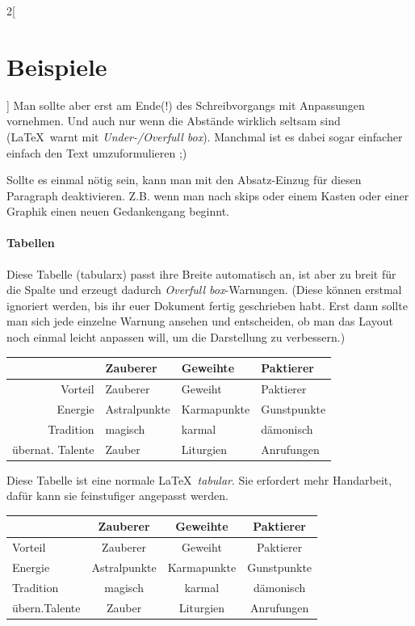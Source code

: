 \documentclass[linksbund,ATvorVT]{rpg-ilaris}
\begin{document}
\begin{multicols}{2}[        %
		\chapter*{Beispiele}  %
		]
Man sollte aber erst am Ende(!) des Schreibvorgangs mit  Anpassungen vornehmen. Und auch nur wenn die Abstände wirklich seltsam sind (\LaTeX\ warnt mit \emph{Under-/Overfull box}). Manchmal ist es dabei sogar einfacher einfach den Text umzuformulieren ;)

Sollte es einmal nötig sein, kann man mit  den Absatz-Einzug für diesen Paragraph deaktivieren. Z.B. wenn man nach skips oder einem Kasten oder einer Graphik einen neuen Gedankengang beginnt.


\subsubsection{Tabellen}
Diese Tabelle (tabularx) passt ihre Breite automatisch an, ist aber zu breit für die Spalte und erzeugt dadurch \emph{Overfull box}-Warnungen. (Diese können erstmal ignoriert werden, bis ihr euer Dokument fertig geschrieben habt. Erst dann sollte man sich jede einzelne Warnung ansehen und entscheiden, ob man das Layout noch einmal leicht anpassen will, um die Darstellung zu verbessern.)

\begin{tabularx}{\linewidth}{rXXX}
			  & \textbf{Zauberer} & \textbf{Geweihte} & \textbf{Paktierer} \\
	\hline
	Vorteil	  & Zauberer	 & Geweiht	   & Paktierer \\   
	Energie	  & Astralpunkte & Karmapunkte & Gunstpunkte \\ 
	Tradition & magisch	     & karmal	   & dämonisch \\   
übernat. Talente & Zauber	 & Liturgien   & Anrufungen \\  
\end{tabularx}

\bigskip

Diese Tabelle ist eine normale \LaTeX\ \emph{tabular}. Sie erfordert mehr Handarbeit, dafür kann sie feinstufiger angepasst werden.


\begin{tabular}{l@{ }c@{\ }c@{\ }c}
			  & \textbf{Zauberer} & \textbf{Geweihte} & \textbf{Paktierer} \\
	\hline
	Vorteil	  & Zauberer	 & Geweiht	   & Paktierer \\
	Energie	  & Astralpunkte & Karmapunkte & Gunstpunkte \\
	Tradition & magisch	     & karmal	   & dämonisch \\
übern.Talente & Zauber	     & Liturgien   & Anrufungen \\
\end{tabular}
\end{multicols}
\end{document}
